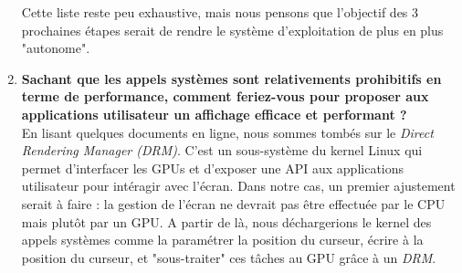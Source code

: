 \documentclass[a4paper]{article}
\begin{document}
\begin{enumerate}
Cette liste reste peu exhaustive, mais nous pensons que l'objectif des 3 prochaines étapes serait de rendre le système d'exploitation de plus en plus "autonome".
\item \textbf{Sachant que les appels systèmes sont relativements prohibitifs en terme de performance, comment feriez-vous pour proposer aux applications utilisateur un affichage efficace et performant ?}\\
En lisant quelques documents en ligne, nous sommes tombés sur le \textit{Direct Rendering Manager (DRM)}. C'est un sous-système du kernel Linux qui permet d'interfacer les GPUs et d'exposer une API aux applications utilisateur pour intéragir avec l'écran.
Dans notre cas, un premier ajustement serait à faire : la gestion de l'écran ne devrait pas être effectuée par le CPU mais plutôt par un GPU.
A partir de là, nous déchargerions le kernel des appels systèmes comme la paramétrer la position du curseur, écrire à la position du curseur, et "sous-traiter" ces tâches au GPU grâce à un \textit{DRM}.
\end{enumerate}
\end{document}
